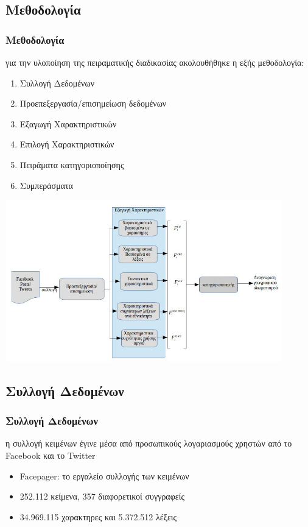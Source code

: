 \documentclass{beamer}
\begin{document}
\begin{frame}
	\section{Μεθοδολογία}
	\frametitle{Μεθοδολογία}
	για την υλοποίηση της πειραματικής διαδικασίας ακολουθήθηκε η εξής μεθοδολογία:\linebreak
	\begin{enumerate}
		\item Συλλογή Δεδομένων
		\item Προεπεξεργασία/επισημείωση δεδομένων
		\item Εξαγωγή Χαρακτηριστικών
		\item Επιλογή Χαρακτηριστικών
		\item Πειράματα κατηγοριοποίησης
		\item Συμπεράσματα
	\end{enumerate}
\end{frame}
\begin{frame}
	\includegraphics[width=12cm]{img/sys}
\end{frame}
\begin{frame}
	\section{Συλλογή Δεδομένων}
		\frametitle{Συλλογή Δεδομένων}
			η συλλογή κειμένων έγινε μέσα από προσωπικούς λογαριασμούς χρηστών από το Facebook και το Twitter\linebreak
			\begin{itemize}
				\item Facepager: το εργαλείο συλλογής των κειμένων\linebreak
				\item 252.112 κείμενα, 357 διαφορετικοί συγγραφείς\linebreak
				\item 34.969.115 χαρακτηρες και 5.372.512 λέξεις
			\end{itemize}
		
\end{frame}
\end{document}
